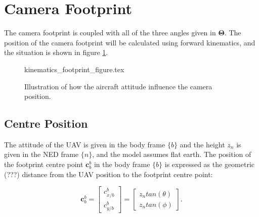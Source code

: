 

%


\section{Camera Footprint}

The camera footprint is coupled with all of the three angles given in $\bm{\Theta}$. The position of the camera footprint will be calculated using forward kinematics, and the situation is shown in figure \ref{fig:footprint_centre}.

\begin{figure}
	{kinematics_footprint_figure.tex}
	\caption{Illustration of how the aircraft attitude influence the camera position.}
	\label{fig:footprint_centre}
\end{figure}

\subsection{Centre Position}

The attitude of the UAV is given in the body frame $\{b\}$ and the height $z_n$ is given in the NED frame $\{n\}$, and the model assumes flat earth. The position of the footprint centre point $\mathbf{c}_b^b$ in the body frame $\{b\}$ is expressed as the geometric (???) distance from the UAV position to the footprint centre point:

\begin{equation}
	\label{eq:camera_position_body}
	\mathbf{c}_b^b =
	\begin{bmatrix}
		c_{x/b}^b \\ c_{y/b}^b
	\end{bmatrix}
	=
	\begin{bmatrix}
		z_n tan(\theta) \\ z_n tan(\phi)
	\end{bmatrix}.
\end{equation}

